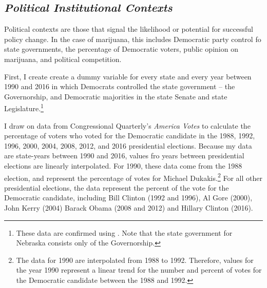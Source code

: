 

%

\subsection{\it{Political Institutional Contexts}}

Political contexts are those that signal the likelihood or potential for successful policy change. In the case of marijuana, this includes Democratic party control fo state governments, the percentage of Democratic voters, public opinion on marijuana, and political competition. 

First, I create create a dummy variable for every state and every year between 1990 and 2016 in which Democrats controlled the state government -- the Governorship, and Democratic majorities in the state Senate and state Legislature.\footnote{These data are confirmed using \citep{wiki_2019}. Note that the state government for Nebraska consists only of the Governorship.} 

I draw on data from Congressional Quarterly's {\it{America Votes}} to calculate the percentage of voters who voted for the Democratic candidate in the 1988, 1992, 1996, 2000, 2004, 2008, 2012, and 2016 presidential elections. Because my data are state-years between 1990 and 2016, values fro years between presidential elections are linearly interpolated. For 1990, these data come from the 1988 election, and represent the percentage of votes for Michael Dukakis.\footnote{The data for 1990 are interpolated from 1988 to 1992. Therefore, values for the year 1990 represent a linear trend for the number and percent of votes for the Democratic candidate between the 1988 and 1992.} For all other presidential elections, the data represent the percent of the vote for the Democratic candidate, including Bill Clinton (1992 and 1996), Al Gore (2000), John Kerry (2004) Barack Obama (2008 and 2012) and Hillary Clinton (2016). 


